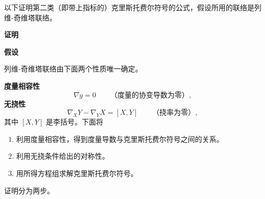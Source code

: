 以下证明第二类（即带上指标的）克里斯托费尔符号的公式，假设所用的联络是列维-奇维塔联络。

\noindent\textbf{证明}

\noindent\textbf{假设}\par
列维-奇维塔联络由下面两个性质唯一确定。

\noindent\textbf{度量相容性}
\[
  \nabla g=0\qquad\text{（度量的协变导数为零）},
\]
\noindent\textbf{无挠性}
\[
  \nabla_XY-\nabla_YX=[X,Y]\qquad\text{（挠率为零）},
\]
其中 $[X,Y]$ 是李括号。下面将
\begin{enumerate}
\item 利用度量相容性，得到度量导数与克里斯托费尔符号之间的关系。
\item 利用无挠条件给出的对称性。
\item 用所得方程组求解克里斯托费尔符号。
\end{enumerate}
证明分为两步。

